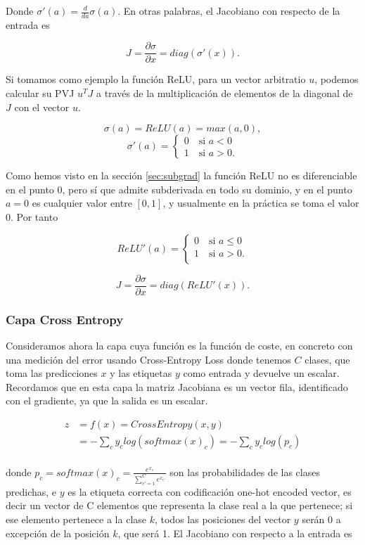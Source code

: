 Donde $\sigma'(a) = \frac{d}{da}\sigma(a)$. En otras palabras, el Jacobiano con respecto de la entrada es 

$$J=\frac{\partial \sigma}{\partial x}= diag(\sigma'(x)).$$

Si tomamos como ejemplo la función ReLU, para un vector arbitratio $u$, podemos calcular su PVJ $u^TJ$ a través de la multiplicación  de elementos de la diagonal de $J$ con el vector $u$. 


$$\sigma(a) = ReLU(a)= max(a,0),$$
$$\sigma'(a)=
\left\{\begin{matrix}

0 \quad \textrm{si } a<0  \\
1 \quad \textrm{si } a>0.
\end{matrix}\right.
$$

Como hemos visto en la sección \ref{sec:subgrad} la función ReLU no es diferenciable en el punto 0, pero sí que admite subderivada en todo su dominio, y en el punto $a=0$ es cualquier valor entre $[0,1]$, y usualmente en la práctica se toma el valor 0. Por tanto

$$ReLU'(a)= \left\{\begin{matrix}

0 \quad \textrm{si } a\leq0  \\
1 \quad \textrm{si } a>0 \textrm{.} \\
\end{matrix} \right.$$

$$J=\frac{\partial \sigma}{\partial x}= diag(ReLU'(x)).$$


\subsubsection{Capa Cross Entropy}

Consideramos ahora la capa cuya función es la función de coste, en concreto con una medición del error usando Cross-Entropy Loss donde tenemos $C$ clases, que toma las predicciones $x$ y las etiquetas $y$ como entrada y devuelve un escalar. Recordamos que en esta capa la matriz Jacobiana es un vector fila, identificado con el gradiente, ya que la salida es un escalar.

\begin{align*}
	z&=f(x)=CrossEntropy(x,y) \\
	&= - \sum_c y_c log(softmax(x)_c) = - \sum_c y_c log(p_c)\\
\end{align*}

donde $p_c=softmax(x)_c= \frac{e^{x_c}}{\sum_{c'=1}^C e^{x_{c'}}}$ son las probabilidades de las clases predichas, e $y$ es la etiqueta correcta con codificación one-hot encoded vector, es decir un vector de C elementos que representa la clase real a la que pertenece; si ese elemento pertenece a la clase $k$, todos las posiciones del vector $y$ serán 0 a excepción de la posición $k$, que será 1. El Jacobiano con respecto a la entrada es

